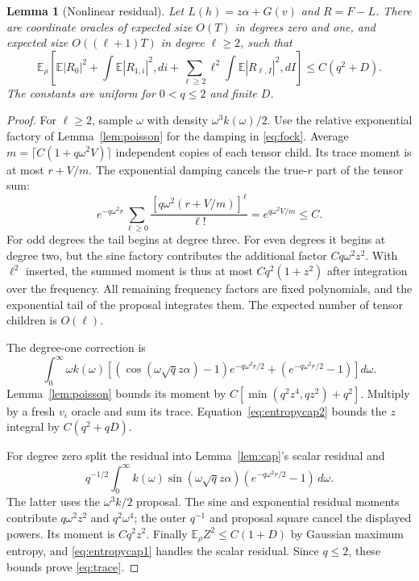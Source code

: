 \documentclass[11pt]{article}
\newtheorem{lemma}[theorem]{Lemma}
\newcommand{\E}{\mathbb E}
\begin{document}
\begin{lemma}[Nonlinear residual]
\label{lem:residual}
Let $L(h)=z\alpha+G(v)$ and $R=F-L$. There are coordinate oracles of expected size $O(T)$ in degrees zero and one, and expected size $O((\ell+1)T)$ in degree $\ell\ge2$, such that
\begin{equation}
 \E_\rho\left[\E|R_0|^2+\int\E|R_{1,i}|^2,di
   +\sum_{\ell\ge2}\ell^2\int\E|R_{\ell,I}|^2,dI\right]
 \le C(q^2+D).
 \label{eq:trace}
\end{equation}
The constants are uniform for $0<q\le2$ and finite $D$.
\end{lemma}
\begin{proof}
For $\ell\ge2$, sample $\omega$ with density $\omega^3k(\omega)/2$. Use the relative exponential factory of Lemma~\ref{lem:poisson} for the damping in \eqref{eq:fock}. Average $m=\lceil C(1+q\omega^2V)\rceil$ independent copies of each tensor child. Its trace moment is at most $r+V/m$. The exponential damping cancels the true-$r$ part of the tensor sum:
\[
 e^{-q\omega^2r}\sum_{\ell\ge0}\frac{[q\omega^2(r+V/m)]^\ell}{\ell!}
 =e^{q\omega^2V/m}\le C.
\]
For odd degrees the tail begins at degree three. For even degrees it begins at degree two, but the sine factory contributes the additional factor $Cq\omega^2z^2$. With $\ell^2$ inserted, the summed moment is thus at most $Cq^2(1+z^2)$ after integration over the frequency. All remaining frequency factors are fixed polynomials, and the exponential tail of the proposal integrates them. The expected number of tensor children is $O(\ell)$.

The degree-one correction is
\[
 \int_0^\infty\omega k(\omega)
 \left[(\cos(\omega\sqrt qz\alpha)-1)e^{-q\omega^2r/2}
                 +(e^{-q\omega^2r/2}-1)\right]d\omega.
\]
Lemma~\ref{lem:poisson} bounds its moment by
$C[\min(q^2z^4,qz^2)+q^2]$. Multiply by a fresh $v_i$ oracle and sum its trace. Equation~\eqref{eq:entropycap2} bounds the $z$ integral by $C(q^2+qD)$.

For degree zero split the residual into Lemma~\ref{lem:cap}'s scalar residual and
\[
 q^{-1/2}\int_0^\infty k(\omega)\sin(\omega\sqrt qz\alpha)
                         (e^{-q\omega^2r/2}-1)\,d\omega.
\]
The latter uses the $\omega^3k/2$ proposal. The sine and exponential residual moments contribute $q\omega^2z^2$ and $q^2\omega^4$; the outer $q^{-1}$ and proposal square cancel the displayed powers. Its moment is $Cq^2z^2$. Finally $\E_\rho Z^2\le C(1+D)$ by Gaussian maximum entropy, and \eqref{eq:entropycap1} handles the scalar residual. Since $q\le2$, these bounds prove \eqref{eq:trace}.
\end{proof}
\end{document}
